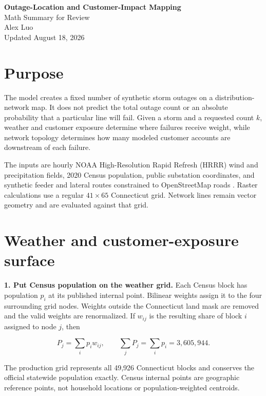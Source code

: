 \documentclass[11pt]{article}
\begin{document}
\begin{center}
  {\Large\textbf{Outage-Location and Customer-Impact Mapping}}\\[0.2em]
  {\large Math Summary for Review}\\[0.4em]
  Alex Luo\\[-0.05em]
  \small Updated August 18, 2026
\end{center}
\vspace{-0.8em}

\section*{Purpose}

The model creates a fixed number of synthetic storm outages on a distribution-network map. It does not predict the total outage count or an absolute probability that a particular line will fail. Given a storm and a requested count $k$, weather and customer exposure determine where failures receive weight, while network topology determines how many modeled customer accounts are downstream of each failure.

The inputs are hourly NOAA High-Resolution Rapid Refresh (HRRR) wind and precipitation fields, 2020 Census population, public substation coordinates, and synthetic feeder and lateral routes constrained to OpenStreetMap roads \citep{noaahrrr,census2020,hifld,openstreetmap}. Raster calculations use a regular $41\times65$ Connecticut grid. Network lines remain vector geometry and are evaluated against that grid.

\section*{Weather and customer-exposure surface}

\textbf{1. Put Census population on the weather grid.}
Each Census block has population $p_i$ at its published internal point. Bilinear weights assign it to the four surrounding grid nodes. Weights outside the Connecticut land mask are removed and the valid weights are renormalized. If $w_{ij}$ is the resulting share of block $i$ assigned to node $j$, then

\begin{equation}
  P_j=\sum_i p_iw_{ij},
  \qquad
  \sum_j P_j=\sum_i p_i=3{,}605{,}944.
  \label{eq:population-allocation}
\end{equation}

The production grid represents all 49,926 Connecticut blocks and conserves the official statewide population exactly. Census internal points are geographic reference points, not household locations or population-weighted centroids.
\end{document}
